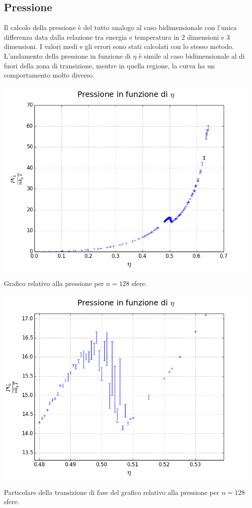 \subsection{Pressione}
Il calcolo della pressione è del tutto analogo al caso bidimensionale con l'unica differenza data dalla relazione tra energia e temperatura in 2 dimensioni e 3 dimensioni. I valori medi e gli errori sono stati calcolati con lo stesso metodo.\\
L'andamento della pressione in funzione di $\eta$ è simile al caso bidimensionale al di fuori della zona di transizione, mentre in quella regione, la curva ha un comportamento molto diverso.
\begin{myfig}[h]
	\includegraphics[scale=0.55]{sfere3D/pressione.png}
	\caption{Grafico relativo alla pressione per $n=128$ sfere.}
\end{myfig}
\begin{myfig}[h]
	\includegraphics[scale=0.55]{sfere3D/pressionezoomzoom.png}
	\caption{Particolare della transizione di fase del grafico relativo alla pressione per $n=128$ sfere.}
\end{myfig}

